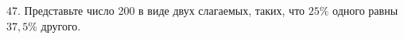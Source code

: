47. Представьте число 200 в виде двух слагаемых, таких, что $25\%$ одного равны $37,5\%$ другого.\\
